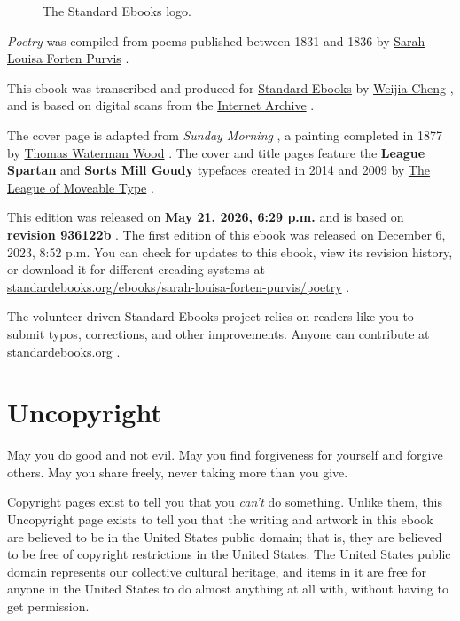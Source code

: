 \documentclass[11pt,a4paper]{article}
\begin{document}
\begin{figure}[h]
\caption{The Standard Ebooks logo.}
\end{figure}

\textit{Poetry} was compiled from poems published between 1831 and 1836 by \href{https://en.wikipedia.org/wiki/Sarah\_Louisa\_Forten\_Purvis}{Sarah Louisa Forten Purvis} .

This ebook was transcribed and produced for \href{https://standardebooks.org/}{Standard Ebooks} by \href{https://weijiarhymeswith.asia/}{Weijia Cheng} ,
and is based on digital scans from the \href{https://standardebooks.org/ebooks/sarah-louisa-forten-purvis/poetry\#page-scans}{Internet Archive} .

The cover page is adapted from \textit{Sunday Morning} ,
a painting completed in 1877 by \href{https://en.wikipedia.org/wiki/Thomas\_Waterman\_Wood}{Thomas Waterman Wood} .
The cover and title pages feature the \textbf{League Spartan} and \textbf{Sorts Mill Goudy} typefaces created in 2014 and 2009 by \href{https://www.theleagueofmoveabletype.com/}{The League of Moveable Type} .

This edition was released on \textbf{May 21, 2026, 6:29 p.m.} and is based on \textbf{revision 936122b} .
The first edition of this ebook was released on
December 6, 2023, 8:52 p.m.
You can check for updates to this ebook, view its revision history, or download it for different ereading systems at \href{https://standardebooks.org/ebooks/sarah-louisa-forten-purvis/poetry}{standardebooks.org/ebooks/sarah-louisa-forten-purvis/poetry} .

The volunteer-driven Standard Ebooks project relies on readers like you to submit typos, corrections, and other improvements. Anyone can contribute at \href{https://standardebooks.org/}{standardebooks.org} .

\section{Uncopyright}

May you do good and not evil.
May you find forgiveness for yourself and forgive others.
May you share freely, never taking more than you give.

Copyright pages exist to tell you that you \textit{can't} do something. Unlike them, this Uncopyright page exists to tell you that the writing and artwork in this ebook are believed to be in the United States public domain; that is, they are believed to be free of copyright restrictions in the United States. The United States public domain represents our collective cultural heritage, and items in it are free for anyone in the United States to do almost anything at all with, without having to get permission.
\end{document}
